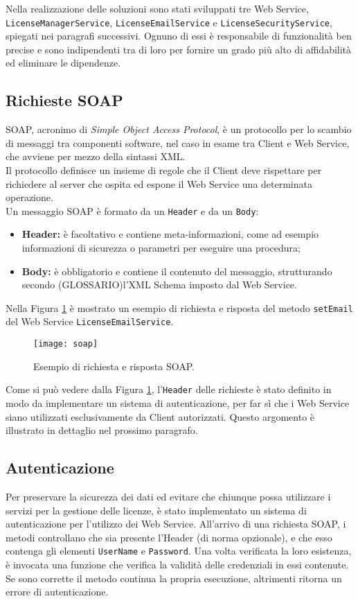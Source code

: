 Nella realizzazione delle soluzioni sono stati sviluppati tre Web Service,\\ \texttt{LicenseManagerService}, \texttt{LicenseEmailService} e \texttt{LicenseSecurityService}, spiegati nei paragrafi successivi. Ognuno di essi è responsabile di funzionalità ben precise e sono indipendenti tra di loro per fornire un grado più alto di affidabilità ed eliminare le dipendenze.


\subsection{Richieste SOAP}
\label{soap}
SOAP, acronimo di \textit{Simple Object Access Protocol}, è un protocollo per lo scambio di messaggi tra componenti software, nel caso in esame tra Client e Web Service, che avviene per mezzo della sintassi XML. \\
Il protocollo definisce un insieme di regole che il Client deve rispettare per richiedere al server che ospita ed espone il Web Service una determinata operazione.
\\
Un messaggio SOAP è formato da un \texttt{Header} e da un \texttt{Body}:
\begin{itemize}
\item \textbf{Header:} è facoltativo e contiene meta-informazioni, come ad esempio informazioni di sicurezza o parametri per eseguire una procedura;
\item \textbf{Body:} è obbligatorio e contiene il contenuto del messaggio, strutturando secondo (GLOSSARIO)l'XML Schema imposto dal Web Service.
\end{itemize}

Nella Figura \ref{soap} è mostrato un esempio di richiesta e risposta del metodo \texttt{setEmail} del Web Service \texttt{LicenseEmailService}.

\begin{figure}[!h] 
    \centering 
    \texttt{[image: soap]} 
    \caption{Esempio di richiesta e risposta SOAP.}
    \label{soap}
\end{figure}

Come si può vedere dalla Figura \ref{soap}, l'\texttt{Header} delle richieste è stato definito in modo da implementare un sistema
di autenticazione, per far sì che i Web Service siano utilizzati esclusivamente da Client autorizzati. Questo argomento è illustrato in dettaglio nel prossimo paragrafo.

\subsection{Autenticazione}
Per preservare la sicurezza dei dati ed evitare che chiunque possa utilizzare i servizi per la gestione delle licenze, è stato implementato un sistema di autenticazione per l'utilizzo dei Web Service. All'arrivo di una richiesta SOAP, i metodi controllano che sia presente l'Header (di norma opzionale), e che esso contenga gli elementi \texttt{UserName} e \texttt{Password}. Una volta verificata la loro esistenza, è invocata una funzione che verifica la validità delle credenziali in essi contenute. Se sono corrette il metodo continua la propria esecuzione, altrimenti ritorna un errore di autenticazione.

